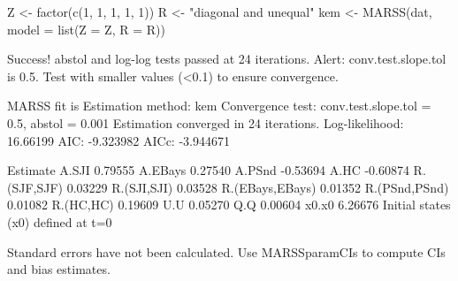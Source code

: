 \begin{Schunk}
\begin{Sinput}
 Z <- factor(c(1, 1, 1, 1, 1))
 R <- "diagonal and unequal"
 kem <- MARSS(dat, model = list(Z = Z, R = R))
\end{Sinput}
\begin{Soutput}
Success! abstol and log-log tests passed at 24 iterations.
Alert: conv.test.slope.tol is 0.5.
Test with smaller values (<0.1) to ensure convergence.

MARSS fit is
Estimation method: kem 
Convergence test: conv.test.slope.tol = 0.5, abstol = 0.001
Estimation converged in 24 iterations. 
Log-likelihood: 16.66199 
AIC: -9.323982   AICc: -3.944671   
 
                Estimate
A.SJI            0.79555
A.EBays          0.27540
A.PSnd          -0.53694
A.HC            -0.60874
R.(SJF,SJF)      0.03229
R.(SJI,SJI)      0.03528
R.(EBays,EBays)  0.01352
R.(PSnd,PSnd)    0.01082
R.(HC,HC)        0.19609
U.U              0.05270
Q.Q              0.00604
x0.x0            6.26676
Initial states (x0) defined at t=0

Standard errors have not been calculated. 
Use MARSSparamCIs to compute CIs and bias estimates.
\end{Soutput}
\end{Schunk}
